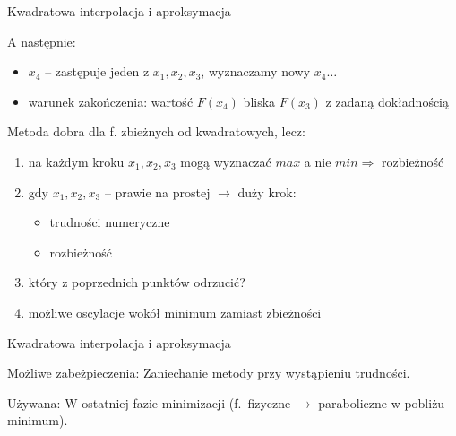  \begin{frame}{Kwadratowa interpolacja i aproksymacja}
    \begin{block}{A następnie:}
      \begin{itemize}
        \item $x_{4}$ -- zastępuje jeden z $x_{1}{,}x_{2}{,}x_{3}$,
        wyznaczamy nowy $x_{4} \dots$
        \item warunek zakończenia: wartość $F(x_{4})$ bliska
        $F(x_{3})$ z zadaną dokładnością
      \end{itemize}
    \end{block}
    \begin{block}{Metoda dobra dla f. zbieżnych od kwadratowych, lecz:}
      \begin{enumerate}
        \item na każdym kroku $x_{1}{,}x_{2}{,}x_{3}$ mogą
        wyznaczać $max$ a nie $min \Rightarrow$ rozbieżność
        \item gdy $x_{1}{,}x_{2}{,}x_{3}$ -- prawie na prostej
        $\to$ duży krok:
        \begin{itemize}
          \item trudności numeryczne
          \item rozbieżność
        \end{itemize}
        \item który z poprzednich punktów odrzucić?
        \item możliwe oscylacje wokół minimum zamiast zbieżności
      \end{enumerate}
    \end{block}
  \end{frame}

    \begin{frame}{Kwadratowa interpolacja i aproksymacja}
      \begin{block}{Możliwe zabeżpieczenia:}
        Zaniechanie metody przy wystąpieniu trudności.
      \end{block}
      \begin{block}{Używana:}
        W ostatniej fazie minimizacji (f.~fizyczne $\to$
        paraboliczne w pobliżu minimum).
      \end{block}
    \end{frame}

